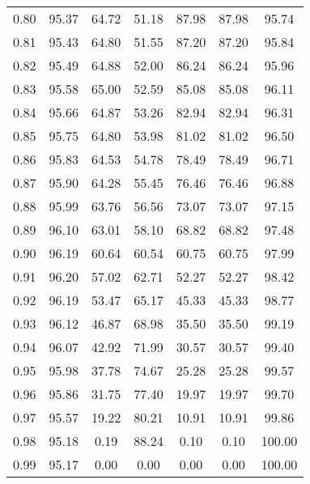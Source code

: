 \begin{tabular}{|c|c|c|c|c|c|c|}
      0.80 &     95.37 &     64.72 &      51.18 &   87.98 &      87.98 &         95.74 \\
      0.81 &     95.43 &     64.80 &      51.55 &   87.20 &      87.20 &         95.84 \\
      0.82 &     95.49 &     64.88 &      52.00 &   86.24 &      86.24 &         95.96 \\
      0.83 &     95.58 &     65.00 &      52.59 &   85.08 &      85.08 &         96.11 \\
      0.84 &     95.66 &     64.87 &      53.26 &   82.94 &      82.94 &         96.31 \\
      0.85 &     95.75 &     64.80 &      53.98 &   81.02 &      81.02 &         96.50 \\
      0.86 &     95.83 &     64.53 &      54.78 &   78.49 &      78.49 &         96.71 \\
      0.87 &     95.90 &     64.28 &      55.45 &   76.46 &      76.46 &         96.88 \\
      0.88 &     95.99 &     63.76 &      56.56 &   73.07 &      73.07 &         97.15 \\
      0.89 &     96.10 &     63.01 &      58.10 &   68.82 &      68.82 &         97.48 \\
      0.90 &     96.19 &     60.64 &      60.54 &   60.75 &      60.75 &         97.99 \\
      0.91 &     96.20 &     57.02 &      62.71 &   52.27 &      52.27 &         98.42 \\
      0.92 &     96.19 &     53.47 &      65.17 &   45.33 &      45.33 &         98.77 \\
      0.93 &     96.12 &     46.87 &      68.98 &   35.50 &      35.50 &         99.19 \\
      0.94 &     96.07 &     42.92 &      71.99 &   30.57 &      30.57 &         99.40 \\
      0.95 &     95.98 &     37.78 &      74.67 &   25.28 &      25.28 &         99.57 \\
      0.96 &     95.86 &     31.75 &      77.40 &   19.97 &      19.97 &         99.70 \\
      0.97 &     95.57 &     19.22 &      80.21 &   10.91 &      10.91 &         99.86 \\
      0.98 &     95.18 &      0.19 &      88.24 &    0.10 &       0.10 &        100.00 \\
      0.99 &     95.17 &      0.00 &       0.00 &    0.00 &       0.00 &        100.00 \\
\bottomrule
\end{tabular}
